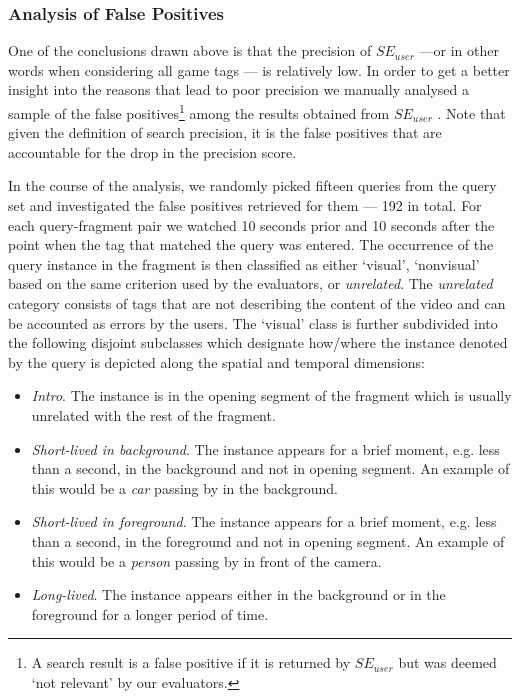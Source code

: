 \subsubsection{Analysis of False Positives}
One of the conclusions drawn above is that the precision of $SE_{user}$ ---or in other words when considering all game tags --- is relatively low. In order to get a better insight into the reasons that lead to poor precision we manually analysed a sample of the false positives\footnote{A search result is a false positive if it is returned by $SE_{user}$ but was deemed `not relevant' by our evaluators.} among the results obtained from $SE_{user}$ . Note that given the definition of search precision, it is the false positives that are accountable for the drop in the precision score.

In the course of the analysis, we randomly picked fifteen queries from the query set and investigated the false positives retrieved for them --- 192 in total. For each query-fragment pair we watched 10 seconds prior and 10 seconds after the point when the tag that matched the query was entered. The occurrence of the query instance in the fragment is then classified as either `visual', `nonvisual' based on the same criterion used by the evaluators, or \textit{unrelated}. The \textit{unrelated} category consists of tags that are not describing the content of the video and can be accounted as errors by the users. The `visual' class is further subdivided into the following disjoint subclasses which designate how/where the instance denoted by the query is depicted along the spatial and temporal dimensions:
\begin{itemize}
\item \textit{Intro}. The instance is in the opening segment of the fragment which is usually unrelated with the rest of the fragment.
\item \textit{Short-lived in background}. The instance appears for a brief moment, e.g. less than a second, in the background and not in opening segment. An example of this would be a \textit{car} passing by in the background.
\item \textit{Short-lived in foreground}. The instance appears for a brief moment, e.g. less than a second, in the foreground and not in opening segment. An example of this  would be a \textit{person} passing by in front of the camera.
\item \textit{Long-lived}. The instance appears either in the background or in the foreground for a longer period of time.
\end{itemize}
